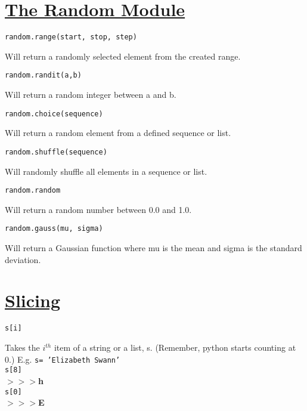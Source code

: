 \section*{\underline{The Random Module}}
\noindent \texttt{random.range(start, stop, step)}
\begin{myindentpar}{1.4cm}
\vspace*{-1ex}
Will return a randomly selected element from the created range.
\end{myindentpar}

\noindent \texttt{random.randit(a,b)}
\begin{myindentpar}{1.4cm}
\vspace*{-1ex}
Will return a random integer between a and b.
\end{myindentpar}

\noindent \texttt{random.choice(sequence)}
\begin{myindentpar}{1.4cm}
\vspace*{-1ex}
Will return a random element from a defined sequence or list.
\end{myindentpar}

\noindent \texttt{random.shuffle(sequence)}
\begin{myindentpar}{1.4cm}
\vspace*{-1ex}
Will randomly shuffle all elements in a sequence or list.
\end{myindentpar}

\noindent \texttt{random.random}
\begin{myindentpar}{1.4cm}
\vspace*{-1ex}
Will return a random number between 0.0 and 1.0.
\end{myindentpar}

\noindent \texttt{random.gauss(mu, sigma)}
\begin{myindentpar}{1.4cm}
\vspace*{-1ex}
Will return a Gaussian function where mu is the mean and sigma is the standard deviation.
\end{myindentpar}

\section*{\underline{Slicing}}
\noindent \texttt{s[i]}
\begin{myindentpar}{1.4cm}
\vspace*{-1ex}
Takes the $i^{th}$ item of a string or a list, s. (Remember, python starts counting at 0.)
E.g. \texttt{s= 'Elizabeth Swann'}\\
\texttt{s[8]}\\
\textbf{$>>>$h}\\
\texttt{s[0]}\\
\textbf{$>>>$E}
\end{myindentpar}

